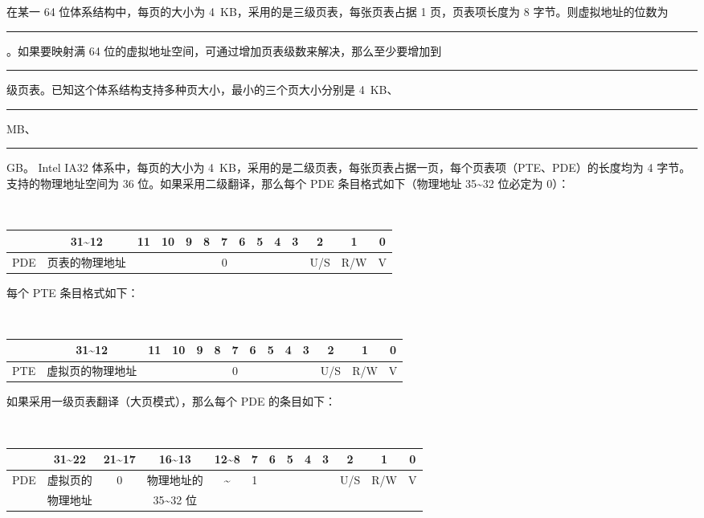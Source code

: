     \begin{problems}
        \pro 在某一 64 位体系结构中，每页的大小为 \SI{4}{KB}，采用的是三级页表，每张页表占据 1 页，页表项长度为 8 字节。则虚拟地址的位数为 \rule{2.5cm}{0.25mm}。如果要映射满 64 位的虚拟地址空间，可通过增加页表级数来解决，那么至少要增加到 \rule{2.5cm}{0.25mm} 级页表。已知这个体系结构支持多种页大小，最小的三个页大小分别是 \SI{4}{KB}、\rule{2.5cm}{0.25mm} \si{MB}、\rule{2.5cm}{0.25mm} \si{GB}。
        \pro Intel IA32 体系中，每页的大小为 \SI{4}{KB}，采用的是二级页表，每张页表占据一页，每个页表项（PTE、PDE）的长度均为 4 字节。支持的物理地址空间为 36 位。如果采用二级翻译，那么每个 PDE 条目格式如下（物理地址 35\textasciitilde 32 位必定为 0）：
        \begin{table}[H]
            \tt
            \centering
            \begin{tabular}{|c|c|c|c|c|c|c|c|c|c|c|c|c|c|}
                \hline
                & 31\textasciitilde 12 & 11 & 10 & 9 & 8 & 7 & 6 & 5 & 4 & 3 & 2 & 1 & 0 \\ \hline
                PDE & 页表的物理地址 &  &  &  &  & 0 &  &  &  &  & U/S & R/W & V \\ \hline
            \end{tabular}
        \end{table}
        每个 PTE 条目格式如下：
        \begin{table}[H]
            \tt
            \centering
            \begin{tabular}{|c|c|c|c|c|c|c|c|c|c|c|c|c|c|}
                \hline
                & 31\textasciitilde 12 & 11 & 10 & 9 & 8 & 7 & 6 & 5 & 4 & 3 & 2 & 1 & 0 \\ \hline
                PTE & 虚拟页的物理地址 &  &  &  &  & 0 &  &  &  &  & U/S & R/W & V \\ \hline
            \end{tabular}
        \end{table}
        如果采用一级页表翻译（大页模式），那么每个 PDE 的条目如下：
        \begin{table}[H]
            \tt
            \centering
            \begin{tabular}{|c|c|c|c|c|c|c|c|c|c|c|c|c|}
                \hline
                & 31\textasciitilde 22 & 21\textasciitilde17 & 16\textasciitilde13 & 12\textasciitilde 8 & 7 & 6 & 5 & 4 & 3 & 2 & 1 & 0 \\ \hline
                \multirow{2}{*}{PDE} & 虚拟页的 & \multirow{2}{*}{0} & 物理地址的 & \multirow{2}{*}{\textasciitilde} & \multirow{2}{*}{1} & \multirow{2}{*}{} & \multirow{2}{*}{} & \multirow{2}{*}{} & \multirow{2}{*}{} & \multirow{2}{*}{U/S} & \multirow{2}{*}{R/W} & \multirow{2}{*}{V} \\
                & 物理地址 &  & 35\textasciitilde 32 位 &  &  &  &  &  &  &  &  &  \\ \hline
            \end{tabular}
        \end{table}


\end{problems}
